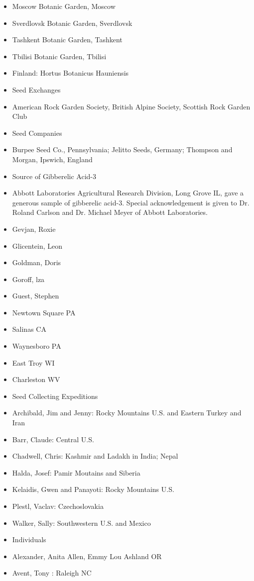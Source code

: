 \begin{itemize}
\item Moscow Botanic Garden, Moscow
\item Sverdlovsk Botanic Garden, Sverdlovsk
\item Tashkent Botanic Garden, Tashkent
\item Tbilisi Botanic Garden, Tbilisi
\item Finland: Hortus Botanicus Hauniensis
\item Seed Exchanges
\item American Rock Garden Society, British Alpine Society, Scottish Rock Garden Club
\item Seed Companies
\item Burpee Seed Co., Pennsylvania; Jelitto Seeds, Germany; Thompson and Morgan,
Ipswich, England
\item Source of Gibberelic Acid-3
\item Abbott Laboratories Agricultural Research Division, Long Grove IL, gave a
generous sample of gibberelic acid-3. Special acknowledgement is given to Dr.
Roland Carlson and Dr. Michael Meyer of Abbott Laboratories.
\item Gevjan, Roxie
\item Glicentein, Leon
\item Goldman, Doris
\item Goroff, lza
\item Guest, Stephen
\item Newtown Square PA
\item Salinas CA
\item Waynesboro PA
\item East Troy WI
\item Charleston WV
\item Seed Collecting Expeditions
\item Archibald, Jim and Jenny: Rocky Mountains U.S. and Eastern Turkey and Iran
\item Barr, Claude: Central U.S.
\item Chadwell, Chris: Kashmir and Ladakh in India; Nepal
\item Halda, Josef: Pamir Moutains and Siberia
\item Kelaidis, Gwen and Panayoti: Rocky Mountains U.S.
\item Plestl, Vaclav: Czechoslovakia
\item Walker, Sally: Southwestern U.S. and Mexico
\item Individuals
\item Alexander, Anita Allen, Emmy Lou Ashland OR
\item Avent, Tony : Raleigh NC

\end{itemize}
